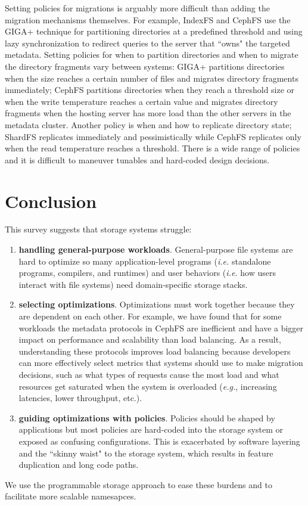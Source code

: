 Setting policies for migrations is arguably more difficult than adding the
migration mechanisms themselves.  For example, IndexFS and CephFS use the GIGA+
technique for partitioning directories at a predefined threshold and using lazy
synchronization to redirect queries to the server that ``owns" the targeted
metadata.  Setting policies for when to partition directories and when to
migrate the directory fragments vary between systems: GIGA+ partitions
directories when the size reaches a certain number of files and migrates
directory fragments immediately; CephFS partitions directories when they reach
a threshold size or when the write temperature reaches a certain value and
migrates directory fragments when the hosting server has more load than the
other servers in the metadata cluster. Another policy is when and how to
replicate directory state; ShardFS replicates immediately and pessimistically
while CephFS replicates only when the read temperature reaches a threshold.
There is a wide range of policies and it is difficult to maneuver tunables and
hard-coded design decisions.

\section{Conclusion}

This survey suggests that storage systems struggle:

\begin{enumerate}

\item \textbf{handling general-purpose workloads}. General-purpose file systems
are hard to optimize so many application-level programs ({\it i.e.} standalone
programs, compilers, and runtimes) and user behaviors ({\it i.e.} how users
interact with file systems) need domain-specific storage stacks.

\item \textbf{selecting optimizations}. Optimizations must work together
because they are dependent on each other. For example, we have found that for
some workloads the metadata protocols in CephFS are inefficient and have a
bigger impact on performance and scalability than load balancing.  As a result,
understanding these protocols improves load balancing because developers can
more effectively select metrics that systems should use to make migration
decisions, such as what types of requests cause the most load and what
resources get saturated when the system is overloaded ({\it e.g.}, increasing
latencies, lower throughput, etc.).

\item \textbf{guiding optimizations with policies}. Policies should be shaped
by applications but most policies are hard-coded into the storage system or
exposed as confusing configurations. This is exacerbated by software layering
and the ``skinny waist" to the storage system, which results in feature
duplication and long code paths.

\end{enumerate}

We use the programmable storage approach to ease these burdens and to
facilitate more scalable namesapces.

